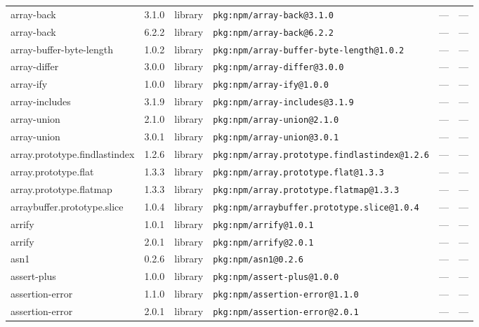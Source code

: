 \documentclass[11pt,a4paper]{article}
\begin{document}
\begin{longtable}{|p{4cm}|p{2cm}|p{1.6cm}|p{5cm}|p{1.5cm}|p{3.5cm}|}
\raggedright array-back & 3.1.0 & library & \small\texttt{pkg:npm/array-back@3.1.0} & — & \small — \\
\raggedright array-back & 6.2.2 & library & \small\texttt{pkg:npm/array-back@6.2.2} & — & \small — \\
\raggedright array-buffer-byte-length & 1.0.2 & library & \small\texttt{pkg:npm/array-buffer-byte-length@1.0.2} & — & \small — \\
\raggedright array-differ & 3.0.0 & library & \small\texttt{pkg:npm/array-differ@3.0.0} & — & \small — \\
\raggedright array-ify & 1.0.0 & library & \small\texttt{pkg:npm/array-ify@1.0.0} & — & \small — \\
\raggedright array-includes & 3.1.9 & library & \small\texttt{pkg:npm/array-includes@3.1.9} & — & \small — \\
\raggedright array-union & 2.1.0 & library & \small\texttt{pkg:npm/array-union@2.1.0} & — & \small — \\
\raggedright array-union & 3.0.1 & library & \small\texttt{pkg:npm/array-union@3.0.1} & — & \small — \\
\raggedright array.prototype.findlastindex & 1.2.6 & library & \small\texttt{pkg:npm/array.prototype.findlastindex@1.2.6} & — & \small — \\
\raggedright array.prototype.flat & 1.3.3 & library & \small\texttt{pkg:npm/array.prototype.flat@1.3.3} & — & \small — \\
\raggedright array.prototype.flatmap & 1.3.3 & library & \small\texttt{pkg:npm/array.prototype.flatmap@1.3.3} & — & \small — \\
\raggedright arraybuffer.prototype.slice & 1.0.4 & library & \small\texttt{pkg:npm/arraybuffer.prototype.slice@1.0.4} & — & \small — \\
\raggedright arrify & 1.0.1 & library & \small\texttt{pkg:npm/arrify@1.0.1} & — & \small — \\
\raggedright arrify & 2.0.1 & library & \small\texttt{pkg:npm/arrify@2.0.1} & — & \small — \\
\raggedright asn1 & 0.2.6 & library & \small\texttt{pkg:npm/asn1@0.2.6} & — & \small — \\
\raggedright assert-plus & 1.0.0 & library & \small\texttt{pkg:npm/assert-plus@1.0.0} & — & \small — \\
\raggedright assertion-error & 1.1.0 & library & \small\texttt{pkg:npm/assertion-error@1.1.0} & — & \small — \\
\raggedright assertion-error & 2.0.1 & library & \small\texttt{pkg:npm/assertion-error@2.0.1} & — & \small — \\

\end{longtable}
\end{document}
